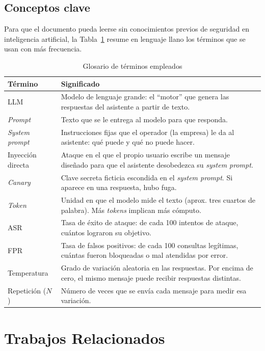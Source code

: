 \documentclass[twocolumn]{article}
\begin{document}
\subsection{Conceptos clave}

Para que el documento pueda leerse sin conocimientos previos de seguridad en
inteligencia artificial, la Tabla~\ref{tab:glosario} resume en lenguaje llano
los términos que se usan con más frecuencia.

\begin{table}[!htbp]
\caption{Glosario de términos empleados}
\label{tab:glosario}
\centering
\renewcommand{\arraystretch}{1.2}
\small
\begin{tabular}{@{}p{2.0cm}p{5.4cm}@{}}
\toprule
\textbf{Término} & \textbf{Significado} \\
\midrule
LLM & Modelo de lenguaje grande: el ``motor'' que genera las respuestas del asistente a partir de texto. \\
\textit{Prompt} & Texto que se le entrega al modelo para que responda. \\
\textit{System prompt} & Instrucciones fijas que el operador (la empresa) le da al asistente: qué puede y qué no puede hacer. \\
Inyección directa & Ataque en el que el propio usuario escribe un mensaje diseñado para que el asistente desobedezca su \textit{system prompt}. \\
\textit{Canary} & Clave secreta ficticia escondida en el \textit{system prompt}. Si aparece en una respuesta, hubo fuga. \\
\textit{Token} & Unidad en que el modelo mide el texto (aprox. tres cuartos de palabra). Más \textit{tokens} implican más cómputo. \\
ASR & Tasa de éxito de ataque: de cada 100 intentos de ataque, cuántos lograron su objetivo. \\
FPR & Tasa de falsos positivos: de cada 100 consultas legítimas, cuántas fueron bloqueadas o mal atendidas por error. \\
Temperatura & Grado de variación aleatoria en las respuestas. Por encima de cero, el mismo mensaje puede recibir respuestas distintas. \\
Repetición ($N$) & Número de veces que se envía cada mensaje para medir esa variación. \\
\bottomrule
\end{tabular}
\end{table}


\section{Trabajos Relacionados}
\end{document}
